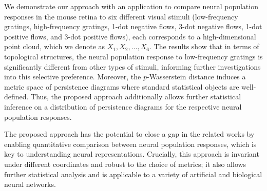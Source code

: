 \documentclass[11pt]{article}
\begin{document}

We demonstrate our approach with an application to compare neural population responses in the mouse retina to six different visual stimuli (low-frequency gratings, high-frequency gratings, 1-dot negative flows, 3-dot negative flows, 1-dot positive flows, and 3-dot positive flows), each corresponds to a high-dimensional point cloud, which we denote as $X_1, X_2, \dots,X_6$. The results show that in terms of topological structures, the neural population response to low-frequency gratings is significantly different from other types of stimuli, informing further investigations into this selective preference. Moreover, the $p$-Wasserstein distance induces a metric space of persistence diagrams where standard statistical objects are well-defined. Thus, the proposed approach additionally allows further statistical inference on a distribution of persistence diagrams for the respective neural population responses.

The proposed approach has the potential to close a gap in the related works by enabling quantitative comparison between neural population responses, which is key to understanding neural representations. Crucially, this approach is invariant under different coordinates and robust to the choice of metrics; it also allows further statistical analysis and is applicable to a variety of artificial and biological neural networks.

\end{document}
